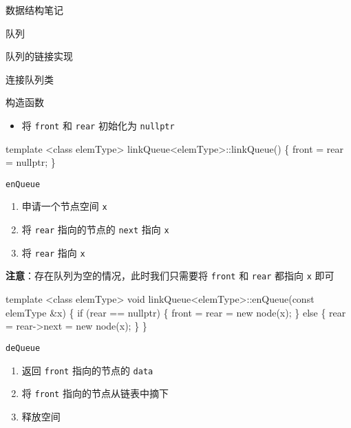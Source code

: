 \documentclass[
  ignorenonframetext,
]{beamer}
\newenvironment{Shaded}{}{}
\newcommand{\NormalTok}[1]{#1}
\providecommand{\tightlist}{%
  \setlength{\itemsep}{0pt}\setlength{\parskip}{0pt}}
\begin{document}
\begin{frame}[fragile]{数据结构笔记}
\begin{block}{队列}
\begin{block}{队列的链接实现}
\begin{block}{连接队列类}
\begin{block}{构造函数}
\protect{}\label{ux6784ux9020ux51fdux6570-6}
\begin{itemize}
\tightlist
\item
  将 \texttt{front} 和 \texttt{rear} 初始化为 \texttt{nullptr}
\end{itemize}

\begin{Shaded}
\begin{Highlighting}[]
\NormalTok{template \textless{}class elemType\textgreater{}}
\NormalTok{linkQueue\textless{}elemType\textgreater{}::linkQueue()}
\NormalTok{\{}
\NormalTok{  front = rear = nullptr;}
\NormalTok{\}}
\end{Highlighting}
\end{Shaded}
\end{block}

\begin{block}{\texttt{enQueue}}
\protect{}\label{enqueue-1}
\begin{enumerate}
\tightlist
\item
  申请一个节点空间 \texttt{x}
\item
  将 \texttt{rear} 指向的节点的 \texttt{next} 指向 \texttt{x}
\item
  将 \texttt{rear} 指向 \texttt{x}
\end{enumerate}

\textbf{注意}：存在队列为空的情况，此时我们只需要将 \texttt{front} 和
\texttt{rear} 都指向 \texttt{x} 即可

\begin{Shaded}
\begin{Highlighting}[]
\NormalTok{template \textless{}class elemType\textgreater{}}
\NormalTok{void linkQueue\textless{}elemType\textgreater{}::enQueue(const elemType \&x)}
\NormalTok{\{}
\NormalTok{  if (rear == nullptr)}
\NormalTok{  \{}
\NormalTok{    front = rear = new node(x);}
\NormalTok{  \}}
\NormalTok{  else}
\NormalTok{  \{}
\NormalTok{    rear = rear{-}\textgreater{}next = new node(x);}
\NormalTok{  \}}
\NormalTok{\}}
\end{Highlighting}
\end{Shaded}
\end{block}

\begin{block}{\texttt{deQueue}}
\protect{}\label{dequeue-1}
\begin{enumerate}
\tightlist
\item
  返回 \texttt{front} 指向的节点的 \texttt{data}
\item
  将 \texttt{front} 指向的节点从链表中摘下
\item
  释放空间
\end{enumerate}


\end{block}
\end{block}
\end{block}
\end{block}
\end{frame}
\end{document}
